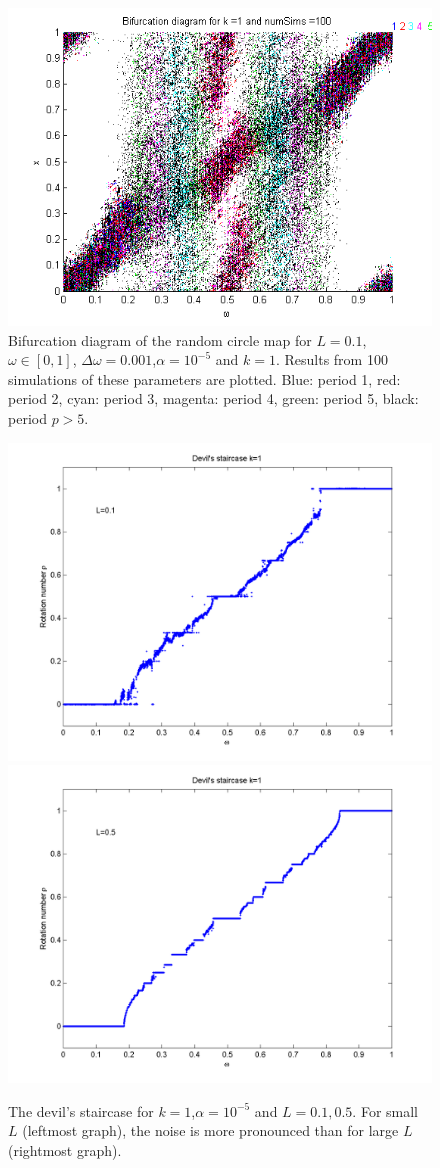 \begin{figure}[H]\linespread{1}
\caption[Bifurcation diagram of the random
circle map]{Bifurcation diagram of the random
circle map for $L=0.1$, $\omega \in [0,1]$, $\Delta \omega = 0.001$,$\alpha = 10^{-5}$
and $k=1$. Results from 100 simulations of these parameters are
plotted. Blue: period 1, red:
period 2, cyan: period 3, magenta: period 4, green: period 5, black:
period $p > 5$.} 
	\begin{center}
		\includegraphics[scale=0.7]{figs/rcirc_bif_L01_k1.png}
	\end{center}
\end{figure}

\begin{figure}[H]\linespread{1}
\caption[The devil's staircase for the random circle map]{The devil's
  staircase for $k=1$,$\alpha = 10^{-5}$ and $L = 0.1,0.5$. For small $L$
  (leftmost graph), the noise is more pronounced than for large $L$
  (rightmost graph).}\label{fig:randdevil1}
\centering
\includegraphics[width=.5\textwidth]{figs/rdevil_k1_L01.png}\hfill
\includegraphics[width=.5\textwidth]{figs/rdevil_k1_L05.png}
\end{figure}

